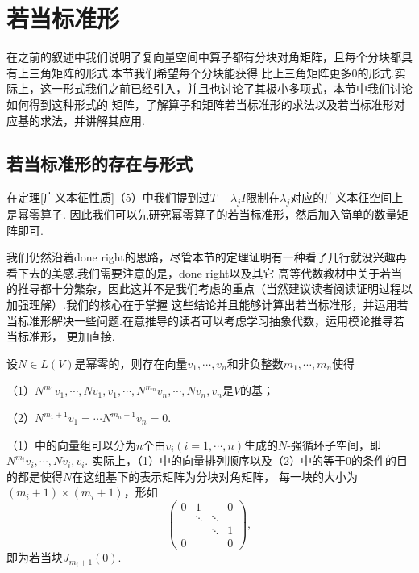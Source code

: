 \chapter{若当标准形}
在之前的叙述中我们说明了复向量空间中算子都有分块对角矩阵，且每个分块都具有上三角矩阵的形式.本节我们希望每个分块能获得
比上三角矩阵更多0的形式.实际上，这一形式我们之前已经引入，并且也讨论了其极小多项式，本节中我们讨论如何得到这种形式的
矩阵，了解算子和矩阵若当标准形的求法以及若当标准形对应基的求法，并讲解其应用.

\section{若当标准形的存在与形式}
在定理\ref{广义本征性质}（5）中我们提到过$T-\lambda_jI$限制在$\lambda_j$对应的广义本征空间上是幂零算子.
因此我们可以先研究幂零算子的若当标准形，然后加入简单的数量矩阵即可.

我们仍然沿着done right的思路，尽管本节的定理证明有一种看了几行就没兴趣再看下去的美感.我们需要注意的是，done right以及其它
高等代数教材中关于若当的推导都十分繁杂，因此这并不是我们考虑的重点（当然建议读者阅读证明过程以加强理解）.我们的核心在于掌握
这些结论并且能够计算出若当标准形，并运用若当标准形解决一些问题.在意推导的读者可以考虑学习抽象代数，运用模论推导若当标准形，
更加直接.
\begin{theorem}\label{若当基存在}
	设$N\in L(V)$是幂零的，则存在向量$v_1,\cdots,v_n$和非负整数$m_1,\cdots,m_n$使得

	\textup{（1）}$N^{m_1}v_1,\cdots,Nv_1,v_1,\cdots,N^{m_n}v_n,\cdots,Nv_n,v_n$是$V$的基；

	\textup{（2）}$N^{m_1+1}v_1=\cdots N^{m_n+1}v_n=0$.
\end{theorem}
（1）中的向量组可以分为$n$个由$v_i(i=1,\cdots,n)$生成的$N$-强循环子空间，即$N^{m_i}v_i,\cdots,Nv_i,v_i$.
实际上，（1）中的向量排列顺序以及（2）中的等于0的条件的目的都是使得$N$在这组基下的表示矩阵为分块对角矩阵，
每一块的大小为$(m_i+1)\times(m_i+1)$，形如$$\begin{pmatrix}
	0 & 1 &  & 0 \\  & \ddots & \ddots &  \\  &  &  \ddots & 1 \\ 0 &  &  & 0
\end{pmatrix},$$即为若当块$J_{m_i+1}(0)$.

